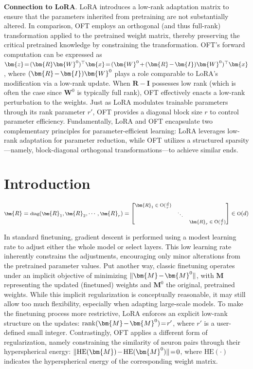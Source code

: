 \begin{itemize}[leftmargin=*,nosep]
\textbf{Connection to LoRA}. LoRA introduces a low-rank adaptation matrix to ensure that the parameters inherited from pretraining are not substantially altered. In comparison, OFT employs an orthogonal (and thus full-rank) transformation applied to the pretrained weight matrix, thereby preserving the critical pretrained knowledge by constraining the transformation. OFT's forward computation can be expressed as $\thickmuskip=2mu \medmuskip=2mu \bm{z}=(\bm{R}\bm{W}^0)^\top\bm{x}=(\bm{W}^0+(\bm{R}-\bm{I})\bm{W}^0)^\top\bm{x}$, where $\thickmuskip=2mu \medmuskip=2mu (\bm{R}-\bm{I})\bm{W}^0$ plays a role comparable to LoRA's modification via a low-rank update. When $\bm{R}-\bm{I}$ possesses low rank (which is often the case since $\bm{W}^0$ is typically full rank), OFT effectively enacts a low-rank perturbation to the weights. Just as LoRA modulates trainable parameters through its rank parameter $r'$, OFT provides a diagonal block size $r$ to control parameter efficiency. Fundamentally, LoRA and OFT encapsulate two complementary principles for parameter-efficient learning: LoRA leverages low-rank adaptation for parameter reduction, while OFT utilizes a structured sparsity—namely, block-diagonal orthogonal transformations—to achieve similar ends.

\section{Introduction}

\begin{equation}
    \footnotesize
    \bm{R}=\text{diag}(\bm{R}_1,\bm{R}_2,\cdots,\bm{R}_r)=\begin{bmatrix}
    \bm{R}_1\in \text{O}(\frac{d}{r}) &  &\\
    &\ddots & \\
    & & \bm{R}_r\in \text{O}(\frac{d}{r})
    \end{bmatrix}\in \text{O}(d)
\end{equation}

In standard finetuning, gradient descent is performed using a modest learning rate to adjust either the whole model or select layers. This low learning rate inherently constrains the adjustments, encouraging only minor alterations from the pretrained parameter values. Put another way, classic finetuning operates under an implicit objective of minimizing $\thickmuskip=2mu \medmuskip=2mu \| \bm{M} - \bm{M}^0\|$, with $\bm{M}$ representing the updated (finetuned) weights and $\bm{M}^0$ the original, pretrained weights. While this implicit regularization is conceptually reasonable, it may still allow too much flexibility, especially when adapting large-scale models. To make the finetuning process more restrictive, LoRA enforces an explicit low-rank structure on the updates: $\thickmuskip=2mu \medmuskip=2mu \text{rank}(\bm{M} - \bm{M}^0)=r'$, where $r'$ is a user-defined small integer. Contrastingly, OFT applies a different form of regularization, namely constraining the similarity of neuron pairs through their hyperspherical energy: $\thickmuskip=2mu \medmuskip=2mu \| \text{HE}(\bm{M})-\text{HE}(\bm{M}^0) \|=0$, where $\text{HE}(\cdot)$ indicates the hyperspherical energy of the corresponding weight matrix. 


\end{itemize}
